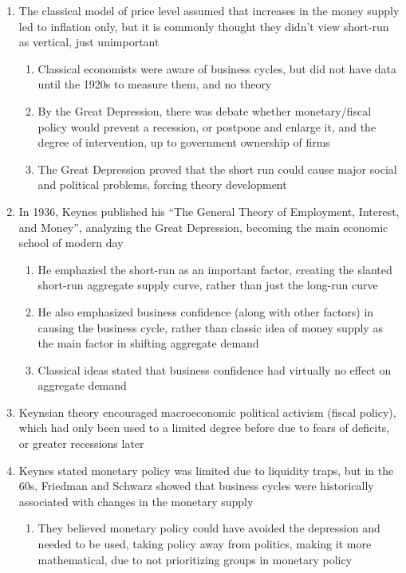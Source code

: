 \documentclass[11 pt, twoside]{article}
\begin{document}
\begin{enumerate}
\item The classical model of price level assumed that increases in the money supply led to inflation only, but it is commonly thought they didn't view short-run as vertical, just unimportant
\begin{enumerate}
\item Classical economists were aware of business cycles, but did not have data until the 1920s to measure them, and no theory
\item By the Great Depression, there was debate whether monetary/fiscal policy would prevent a recession, or postpone and enlarge it, and the degree of intervention, up to government ownership of firms
\item The Great Depression proved that the short run could cause major social and political problems, forcing theory development
\end{enumerate}
\item In 1936, Keynes published his ``The General Theory of Employment, Interest, and Money'', analyzing the Great Depression, becoming the main economic school of modern day
\begin{enumerate}
\item He emphazied the short-run as an important factor, creating the slanted short-run aggregate supply curve, rather than just the long-run curve
\item He also emphasized business confidence (along with other factors) in causing the business cycle, rather than classic idea of money supply as the main factor in shifting aggregate demand
\item Classical ideas stated that business confidence had virtually no effect on aggregate demand
\end{enumerate}
\item Keynsian theory encouraged macroeconomic political activism (fiscal policy), which had only been used to a limited degree before due to fears of deficits, or greater recessions later
\item Keynes stated monetary policy was limited due to liquidity traps, but in the 60s, Friedman and Schwarz showed that business cycles were historically associated with changes in the monetary supply
\begin{enumerate}
\item They believed monetary policy could have avoided the depression and needed to be used, taking policy away from politics, making it more mathematical, due to not prioritizing groups in monetary policy

\end{enumerate}
\end{enumerate}
\end{document}
